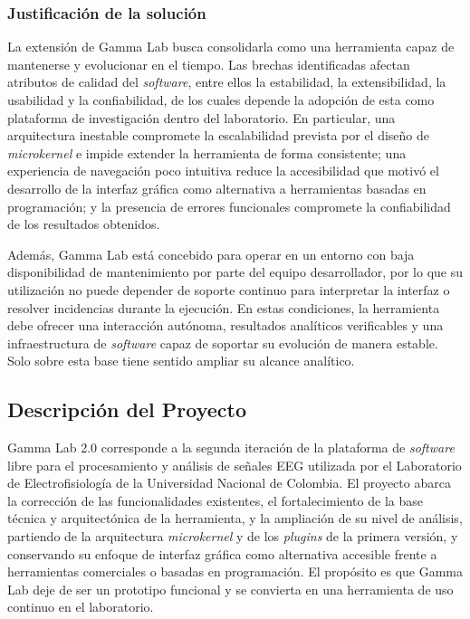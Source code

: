 \documentclass[12pt,letterpaper,oneside]{article}
\begin{document}
\subsubsection{Justificación de la solución}

La extensión de Gamma Lab busca consolidarla como una herramienta capaz de mantenerse y evolucionar en el tiempo. Las brechas identificadas afectan atributos de calidad del \textit{software}, entre ellos la estabilidad, la extensibilidad, la usabilidad y la confiabilidad, de los cuales depende la adopción de esta como plataforma de investigación dentro del laboratorio. En particular, una arquitectura inestable compromete la escalabilidad prevista por el diseño de \textit{microkernel} e impide extender la herramienta de forma consistente; una experiencia de navegación poco intuitiva reduce la accesibilidad que motivó el desarrollo de la interfaz gráfica como alternativa a herramientas basadas en programación; y la presencia de errores funcionales compromete la confiabilidad de los resultados obtenidos.

Además, Gamma Lab está concebido para operar en un entorno con baja disponibilidad de mantenimiento por parte del equipo desarrollador, por lo que su utilización no puede depender de soporte continuo para interpretar la interfaz o resolver incidencias durante la ejecución. En estas condiciones, la herramienta debe ofrecer una interacción autónoma, resultados analíticos verificables y una infraestructura de \textit{software} capaz de soportar su evolución de manera estable. Solo sobre esta base tiene sentido ampliar su alcance analítico.

\subsection{Descripción del Proyecto}
Gamma Lab 2.0 corresponde a la segunda iteración de la plataforma de \textit{software} libre para el procesamiento y análisis de señales EEG utilizada por el Laboratorio de Electrofisiología de la Universidad Nacional de Colombia. El proyecto abarca la corrección de las funcionalidades existentes, el fortalecimiento de la base técnica y arquitectónica de la herramienta, y la ampliación de su nivel de análisis, partiendo de la arquitectura \textit{microkernel} y de los \textit{plugins} de la primera versión, y conservando su enfoque de interfaz gráfica como alternativa accesible frente a herramientas comerciales o basadas en programación. El propósito es que Gamma Lab deje de ser un prototipo funcional y se convierta en una herramienta de uso continuo en el laboratorio.
\end{document}
